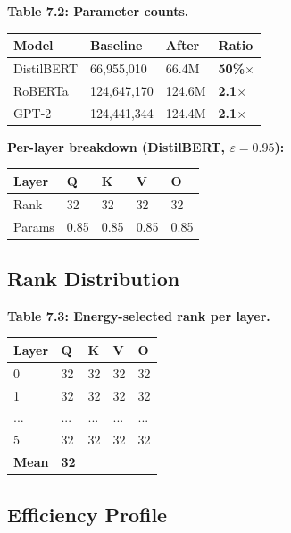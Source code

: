 \textbf{Table 7.2: Parameter counts.}

\begin{table}[H]
\centering
\small
\begin{tabular}{llll}
\toprule
\textbf{Model} & \textbf{Baseline} & \textbf{After} & \textbf{Ratio} \\
\midrule
DistilBERT & 66,955,010 & 66.4M & \textbf{50\%$\times$} \\
RoBERTa & 124,647,170 & 124.6M & \textbf{2.1$\times$} \\
GPT-2 & 124,441,344 & 124.4M & \textbf{2.1$\times$} \\
\bottomrule
\end{tabular}
\end{table}

\textbf{Per-layer breakdown (DistilBERT, $\varepsilon=0.95$):}

\begin{table}[H]
\centering
\small
\begin{tabular}{lllll}
\toprule
\textbf{Layer} & \textbf{Q} & \textbf{K} & \textbf{V} & \textbf{O} \\
\midrule
Rank & 32 & 32 & 32 & 32 \\
Params & 0.85 & 0.85 & 0.85 & 0.85 \\
\bottomrule
\end{tabular}
\end{table}

\subsection{Rank Distribution}

\textbf{Table 7.3: Energy-selected rank per layer.}

\begin{table}[H]
\centering
\small
\begin{tabular}{lllll}
\toprule
\textbf{Layer} & \textbf{Q} & \textbf{K} & \textbf{V} & \textbf{O} \\
\midrule
0 & 32 & 32 & 32 & 32 \\
1 & 32 & 32 & 32 & 32 \\
... & ... & ... & ... & ... \\
5 & 32 & 32 & 32 & 32 \\
\textbf{Mean} & \textbf{32} &  &  &  \\
\bottomrule
\end{tabular}
\end{table}

\subsection{Efficiency Profile}

